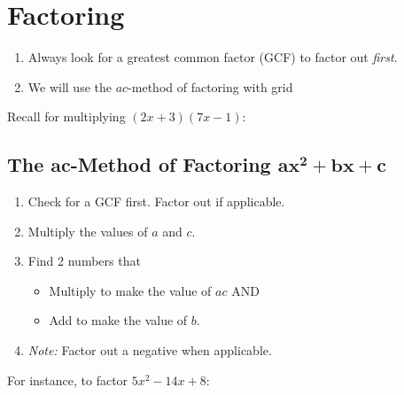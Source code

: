\documentclass{article}
\begin{document}
\section*{Factoring }

\begin{tcolorbox}[colframe=orange!70!white, coltitle=black, title=\textbf{Summary}]
\begin{enumerate}
    \item Always look for a greatest common factor (GCF) to factor out \emph{first}.
    \item We will use the $ac$-method of factoring with grid
\end{enumerate}
\end{tcolorbox}
\bigskip 

Recall for multiplying $(2x + 3)(7x - 1)$:  \newline\\
\begin{center}
\end{center}
\bigskip 

\subsection*{The $\pmb{ac}$-Method of Factoring $\pmb{ax^2 + bx + c}$}

\begin{enumerate}
    \item Check for a GCF first. Factor out if applicable.
    \item Multiply the values of $a$ and $c$.
    \item Find 2 numbers that
    \begin{itemize}
        \item Multiply to make the value of $ac$ AND
        \item Add to make the value of $b$.
    \end{itemize}
    \item \emph{Note:} Factor out a negative when applicable.
\end{enumerate}
\vspace{0.25in} 

For instance, to factor $5x^2 - 14x + 8$: \newline 
\end{document}
